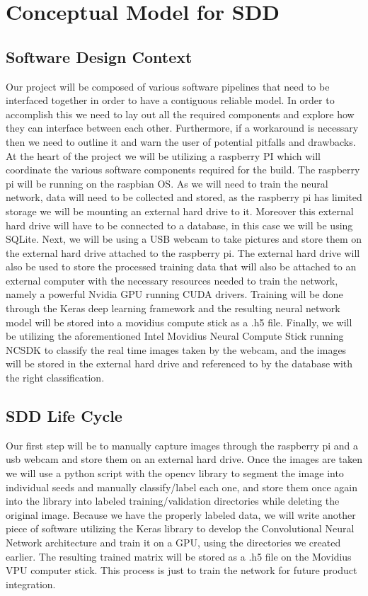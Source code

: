\section{Conceptual Model for SDD}

\subsection{Software Design Context}
Our project will be composed of various software pipelines that need to be interfaced together in order to have a contiguous reliable model. In order to accomplish this we need to lay out all the required components and explore how they can interface between each other. Furthermore, if a workaround is necessary then we need to outline it and warn the user of potential pitfalls and drawbacks. At the heart of the project we will be utilizing a raspberry PI which will coordinate the various software components required for the build. The raspberry pi will be running on the raspbian OS. As we will need to train the neural network, data will need to be collected and stored, as the raspberry pi has limited storage we will be mounting an external hard drive to it. Moreover this external hard drive will have to be connected to a database, in this case we will be using SQLite. Next, we will be using a USB webcam to take pictures and store them on the external hard drive attached to the raspberry pi. The external hard drive will also be used to store the processed training data that will also be attached to an external computer with the necessary resources needed to train the network, namely a powerful Nvidia GPU running CUDA drivers. Training will be done through the Keras deep learning framework and the resulting neural network model will be stored into a movidius compute stick as a .h5 file. Finally, we will be utilizing the aforementioned Intel Movidius Neural Compute Stick running NCSDK to classify the real time images taken by the webcam, and the images will be stored in the external hard drive and referenced to by the database with the right classification.

\subsection{SDD Life Cycle}
Our first step will be to manually capture images through the raspberry pi and a usb webcam and store them on an external hard drive. Once the images are taken we will use a python script with the opencv library to segment the image into individual seeds and manually classify/label each one, and store them once again into the library into labeled training/validation directories while deleting the original image. Because we have the properly labeled data, we will write another piece of software utilizing the Keras library to develop the Convolutional Neural Network architecture and train it on a GPU, using the directories we created earlier. The resulting trained matrix will be stored as a .h5 file on the Movidius VPU computer stick. This process is just to train the network for future product integration.

